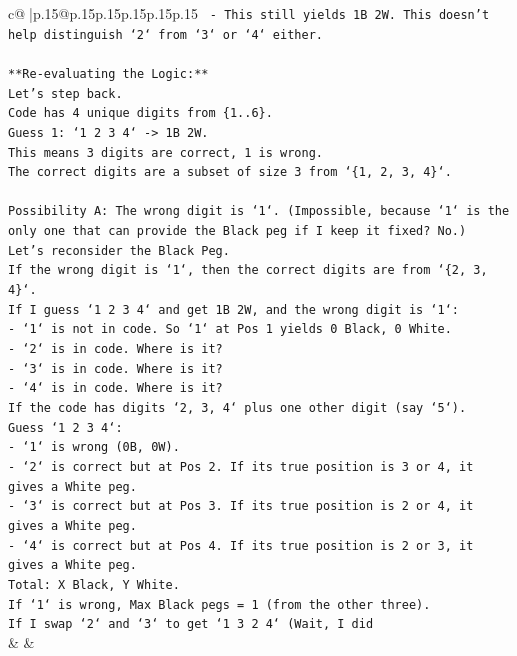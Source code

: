 \documentclass{article}
\begin{document}
{\begin{supertabular}{c@{$\;$}|p{.15\linewidth}@{}p{.15\linewidth}p{.15\linewidth}p{.15\linewidth}p{.15\linewidth}p{.15\linewidth}}
{{{\texttt{    {-} This still yields 1B 2W. This doesn't help distinguish `2` from `3` or `4` either.} \\
\\ 
\texttt{**Re{-}evaluating the Logic:**} \\
\texttt{Let's step back.} \\
\texttt{Code has 4 unique digits from \{1..6\}.} \\
\texttt{Guess 1: `1 2 3 4` {-}> 1B 2W.} \\
\texttt{This means 3 digits are correct, 1 is wrong.} \\
\texttt{The correct digits are a subset of size 3 from `\{1, 2, 3, 4\}`.} \\
\\ 
\texttt{Possibility A: The wrong digit is `1`. (Impossible, because `1` is the only one that can provide the Black peg if I keep it fixed? No.)} \\
\texttt{Let's reconsider the Black Peg.} \\
\texttt{If the wrong digit is `1`, then the correct digits are from `\{2, 3, 4\}`.} \\
\texttt{If I guess `1 2 3 4` and get 1B 2W, and the wrong digit is `1`:} \\
\texttt{{-} `1` is not in code. So `1` at Pos 1 yields 0 Black, 0 White.} \\
\texttt{{-} `2` is in code. Where is it?} \\
\texttt{{-} `3` is in code. Where is it?} \\
\texttt{{-} `4` is in code. Where is it?} \\
\texttt{If the code has digits `2, 3, 4` plus one other digit (say `5`).} \\
\texttt{Guess `1 2 3 4`:} \\
\texttt{{-} `1` is wrong (0B, 0W).} \\
\texttt{{-} `2` is correct but at Pos 2. If its true position is 3 or 4, it gives a White peg.} \\
\texttt{{-} `3` is correct but at Pos 3. If its true position is 2 or 4, it gives a White peg.} \\
\texttt{{-} `4` is correct but at Pos 4. If its true position is 2 or 3, it gives a White peg.} \\
\texttt{Total: X Black, Y White.} \\
\texttt{If `1` is wrong, Max Black pegs = 1 (from the other three).} \\
\texttt{If I swap `2` and `3` to get `1 3 2 4` (Wait, I did} \\
            }
        }
    }
    & & \\ \\


\end{supertabular}}
\end{document}

